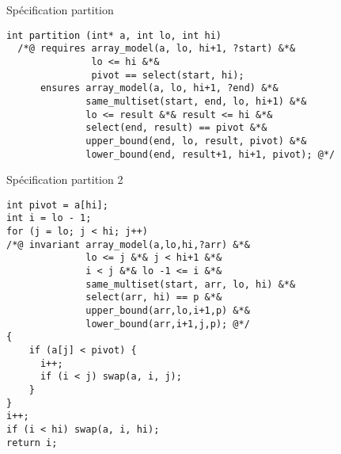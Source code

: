 \documentclass[]{beamer}
\begin{document}
\begin{frame}[fragile]{Sp\'ecification partition}
	\begin{lstlisting}[basicstyle=\footnotesize]
int partition (int* a, int lo, int hi)
  /*@ requires array_model(a, lo, hi+1, ?start) &*& 
               lo <= hi &*&
               pivot == select(start, hi);
      ensures array_model(a, lo, hi+1, ?end) &*& 
              same_multiset(start, end, lo, hi+1) &*&
              lo <= result &*& result <= hi &*&
              select(end, result) == pivot &*&
              upper_bound(end, lo, result, pivot) &*&
              lower_bound(end, result+1, hi+1, pivot); @*/
	\end{lstlisting}
	
	



	
\end{frame}







\begin{frame}[fragile]{Sp\'ecification partition 2}
	\begin{lstlisting}[basicstyle=\footnotesize]
int pivot = a[hi];
int i = lo - 1;
for (j = lo; j < hi; j++)
/*@ invariant array_model(a,lo,hi,?arr) &*&
              lo <= j &*& j < hi+1 &*& 
              i < j &*& lo -1 <= i &*& 
              same_multiset(start, arr, lo, hi) &*& 
              select(arr, hi) == p &*&
              upper_bound(arr,lo,i+1,p) &*& 
              lower_bound(arr,i+1,j,p); @*/
{
    if (a[j] < pivot) {
      i++;
      if (i < j) swap(a, i, j);
    }
}
i++;
if (i < hi) swap(a, i, hi);
return i;
	\end{lstlisting}

\end{frame}
\end{document}
